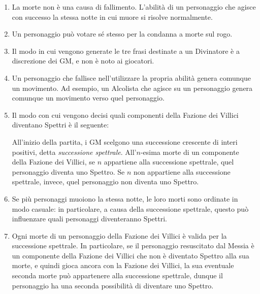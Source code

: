 \documentclass[a4paper,10pt]{article}
\begin{document}
\begin{enumerate}
	\item La morte non è una causa di fallimento. L'abilità di un personaggio che agisce con successo la stessa notte in cui muore si risolve normalmente.

	\item Un personaggio può votare sé stesso per la condanna a morte sul rogo.

	\item Il modo in cui vengono generate le tre frasi destinate a un Divinatore è a discrezione dei GM, e non è noto ai giocatori.

	\item Un personaggio che fallisce nell'utilizzare la propria abilità genera comunque un movimento.
	      Ad esempio, un Alcolista che agisce su un personaggio genera comunque un movimento verso quel personaggio.

	\item Il modo con cui vengono decisi quali componenti della Fazione dei Villici diventano Spettri è il seguente:

	      All'inizio della partita, i GM scelgono una successione crescente di interi positivi, detta \emph{successione spettrale}. All'$n$-esima morte di un componente della Fazione dei Villici, se $n$ appartiene alla successione spettrale, quel personaggio diventa uno Spettro. Se $n$ non appartiene alla successione spettrale, invece, quel personaggio non diventa uno Spettro.

	\item Se più personaggi muoiono la stessa notte, le loro morti sono ordinate in modo casuale: in particolare, a causa della successione spettrale, questo può influenzare quali personaggi diventeranno Spettri.

	\item Ogni morte di un personaggio della Fazione dei Villici è valida per la successione spettrale. In particolare, se il personaggio resuscitato dal Messia è un componente della Fazione dei Villici che non è diventato Spettro alla sua morte, e quindi gioca ancora con la Fazione dei Villici, la sua eventuale seconda morte può appartenere alla successione spettrale, dunque il personaggio ha una seconda possibilità di diventare uno Spettro.


\end{enumerate}
\end{document}
